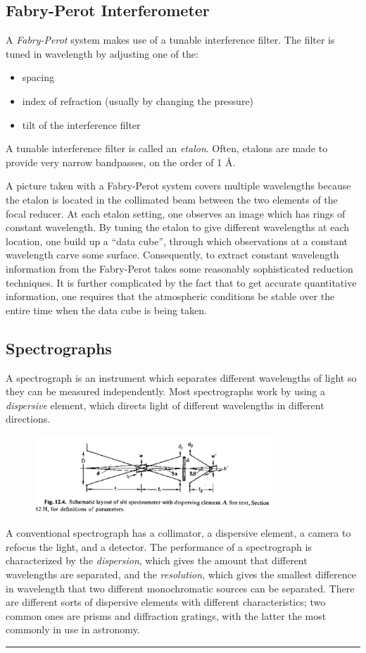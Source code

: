 \documentclass[12pt]{article}
\begin{document}
\subsection{Fabry-Perot Interferometer}
A \emph{Fabry-Perot} system makes use of a tunable interference filter. The
filter is tuned in wavelength by adjusting one of the:
\begin{itemize}
    \item spacing
    \item index of refraction (usually by changing the pressure)
    \item tilt of the interference filter
\end{itemize}
A tunable interference filter is called an \emph{etalon}.
Often, etalons are
made to provide very narrow bandpasses, on the order of 1 \AA{}.
\par A picture taken with a Fabry-Perot system covers multiple wavelengths
because the etalon is located in the collimated beam between the two
elements of the focal reducer. At each etalon setting, one observes an
image which has rings of constant wavelength. By tuning the etalon to
give different wavelengths at each location, one build up a ``data
cube'', through which observations at a constant wavelength carve some
surface. Consequently, to extract constant wavelength information from
the Fabry-Perot takes some reasonably sophisticated reduction
techniques. It is further complicated by the fact that to get accurate
quantitative information, one requires that the atmospheric conditions
be stable over the entire time when the data cube is being taken.

\subsection{Spectrographs}
A spectrograph is an instrument which separates different wavelengths
of light so they can be measured independently. Most spectrographs
work by using a \emph{dispersive} element, which directs light of different
wavelengths in different directions.
\begin{figure}
    \centering
    \includegraphics[width=0.8\textwidth]{slit2.png}
\end{figure}
A conventional spectrograph has a collimator, a dispersive element, a
camera to refocus the light, and a detector. The performance of a
spectrograph is characterized by the \emph{dispersion}, which gives the
amount that different wavelengths are separated, and the \emph{resolution},
which gives the smallest difference in wavelength that two different
monochromatic sources can be separated. There are different sorts of
dispersive elements with different characteristics; two common ones
are prisms and diffraction gratings, with the latter the most commonly
in use in astronomy.
\rule{\textwidth}{0.4pt}
\end{document}
